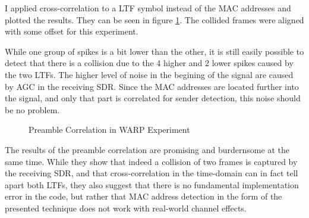 I applied cross-correlation to a \gls{LTF} symbol instead of the MAC addresses and plotted the results. They can be seen in figure \ref{fig:warp_preamble_corr}. The collided frames were aligned with some offset for this experiment.

While one group of spikes is a bit lower than the other, it is still easily possible to detect that there is a collision due to the 4 higher and 2 lower spikes caused by the two \glspl{LTF}. The higher level of noise in the begining of the signal are caused by \gls{AGC} in the receiving \gls{SDR}. Since the MAC addresses are located further into the signal, and only that part is correlated for sender detection, this noise should be no problem.

\begin{figure}[H]
	\centering
	\setlength\figureheight{5cm}
	\setlength{}
	
	\caption{Preamble Correlation in WARP Experiment}
	\label{fig:warp_preamble_corr}
\end{figure}

The results of the preamble correlation are promising and burdernsome at the same time. While they show that indeed a collision of two frames is captured by the receiving \gls{SDR}, and that cross-correlation in the time-domain can in fact tell apart both \glspl{LTF}, they also suggest that there is no fundamental implementation error in the code, but rather that MAC address detection in the form of the presented technique does not work with real-world channel effects.
